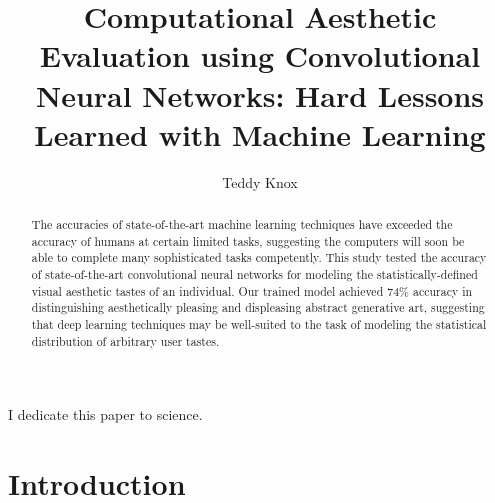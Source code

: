 \documentclass[midd]{thesis}
\title {Computational Aesthetic Evaluation using Convolutional Neural Networks: Hard Lessons Learned with Machine Learning}
\author {Teddy Knox}
\begin{document}
\maketitle

\begin{abstract}
The accuracies of state-of-the-art machine learning techniques have exceeded the accuracy of humans at certain limited tasks, suggesting the computers will soon be able to complete many sophisticated tasks competently. This study tested the accuracy of state-of-the-art convolutional neural networks for modeling the statistically-defined visual aesthetic tastes of an individual. Our trained model achieved 74\% accuracy in distinguishing aesthetically pleasing and displeasing abstract generative art, suggesting that deep learning techniques may be well-suited to the task of modeling the statistical distribution of arbitrary user tastes.
\end{abstract}

\begin{acknowledgements}
I dedicate this paper to science.
\end{acknowledgements}

\contentspage
\tablelistpage
\figurelistpage

\normalspacing \setcounter{page}{1} 

\chapter{Introduction}
\label{sec:intro}
\end{document}
